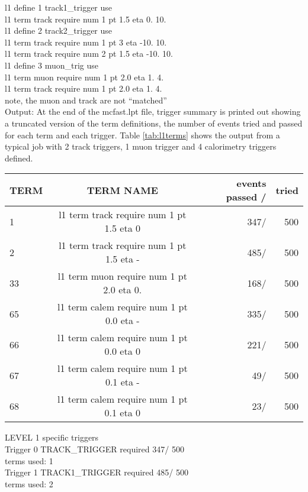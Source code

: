 l1 define 1 track1\_trigger use\\
l1 term track require num 1 pt 1.5 eta 0. 10.\\

l1 define 2 track2\_trigger use\\
l1 term track require num 1 pt 3 eta -10. 10.\\
l1 term track require num 2 pt 1.5 eta -10. 10.\\

l1 define 3 muon\_trig use\\
l1 term muon require num 1 pt 2.0 eta 1. 4.\\
l1 term track  require num 1 pt 2.0 eta 1. 4.\\
{note, the muon and track are not  ``matched''}\\

Output:  At the end of the mcfast.lpt file, trigger summary is printed out
showing a truncated version of the term definitions, the number of events
tried and passed for each term and each trigger.  Table \ref{tab:l1terms} shows
the output from a typical job with 2 track triggers, 1 muon trigger and 4 
calorimetry triggers defined.

\begin{table*}
\caption{  Trigger Programming Summary:  level 1 term definitions}
\label{tab:l1terms}
\begin{tabular*}{\textwidth}{@{}l@{\extracolsep{\fill}}crr}
\hline
    TERM  &          TERM NAME              &            events passed /& tried \\
\hline 
       1  &   l1 term track require num 1 pt 1.5 eta 0      &    347/   &  500\\
       2  &   l1 term track require num 1 pt 1.5 eta -      &    485/   &  500\\
      33  &   l1 term muon require num 1 pt 2.0 eta 0.      &    168/   &  500\\
      65  &   l1 term calem require num 1 pt 0.0 eta -      &    335/   &  500\\
      66  &   l1 term calem require num 1 pt 0.0 eta 0      &    221/   &  500\\
      67  &   l1 term calem require num 1 pt 0.1 eta -      &     49/   &  500\\
      68  &   l1 term calem require num 1 pt 0.1 eta 0      &     23/   &  500\\
\hline
\end{tabular*}
\end{table*}

\filbreak
 LEVEL 1 specific triggers \\
 Trigger 0  TRACK\_TRIGGER                   required           347/     500 \\
    terms used:  1\\
 Trigger 1  TRACK1\_TRIGGER                  required           485/     500  \\
    terms used:  2 \\







